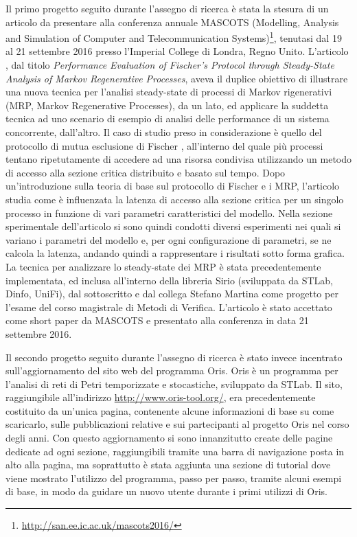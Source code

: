 \documentclass{article}
\begin{document}
    Il primo progetto seguito durante l'assegno di ricerca è stata la stesura di un articolo da presentare alla conferenza annuale MASCOTS (Modelling, Analysis and Simulation of Computer and Telecommunication Systems)\footnote{\url{http://san.ee.ic.ac.uk/mascots2016/}}, tenutasi dal 19 al 21 settembre 2016 presso l'Imperial College di Londra, Regno Unito. L'articolo \cite{mascots16}, dal titolo \textit{Performance Evaluation of Fischer's Protocol through Steady-State Analysis of Markov Regenerative Processes}, aveva il duplice obiettivo di illustrare una nuova tecnica per l'analisi steady-state di processi di Markov rigenerativi (MRP, Markov Regenerative Processes), da un lato, ed applicare la suddetta tecnica ad uno scenario di esempio di analisi delle performance di un sistema concorrente, dall'altro. Il caso di studio preso in considerazione è quello del protocollo di mutua esclusione di Fischer \cite{fischer85}, all'interno del quale più processi tentano ripetutamente di accedere ad una risorsa condivisa utilizzando un metodo di accesso alla sezione critica distribuito e basato sul tempo. Dopo un'introduzione sulla teoria di base sul protocollo di Fischer e i MRP, l'articolo studia come è influenzata la latenza di accesso alla sezione critica per un singolo processo in funzione di vari parametri caratteristici del modello. Nella sezione sperimentale dell'articolo si sono quindi condotti diversi esperimenti nei quali si variano i parametri del modello e, per ogni configurazione di parametri, se ne calcola la latenza, andando quindi a rappresentare i risultati sotto forma grafica. La tecnica per analizzare lo steady-state dei MRP è stata precedentemente implementata, ed inclusa all'interno della libreria Sirio (sviluppata da STLab, Dinfo, UniFi), dal sottoscritto e dal collega Stefano Martina come progetto per l'esame del corso magistrale di Metodi di Verifica. L'articolo è stato accettato come short paper da MASCOTS e presentato alla conferenza in data 21 settembre 2016.
    
    Il secondo progetto seguito durante l'assegno di ricerca è stato invece incentrato sull'aggiornamento del sito web del programma Oris. Oris è un programma per l'analisi di reti di Petri temporizzate e stocastiche, sviluppato da STLab. Il sito, raggiungibile all'indirizzo \url{http://www.oris-tool.org/}, era precedentemente costituito da un'unica pagina, contenente alcune informazioni di base su come scaricarlo, sulle pubblicazioni relative e sui partecipanti al progetto Oris nel corso degli anni. Con questo aggiornamento si sono innanzitutto create delle pagine dedicate ad ogni sezione, raggiungibili tramite una barra di navigazione posta in alto alla pagina, ma soprattutto è stata aggiunta una sezione di tutorial dove viene mostrato l'utilizzo del programma, passo per passo, tramite alcuni esempi di base, in modo da guidare un nuovo utente durante i primi utilizzi di Oris.
    
\end{document}

